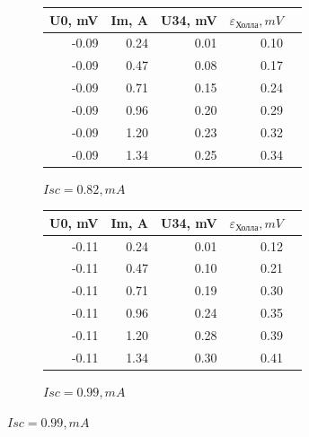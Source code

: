 \documentclass[a4paper, 12pt]{article}
\begin{document}
\begin{figure}[ht]
    \begin{subfigure}[b]{0.45\textwidth}
        \centering
        \begin{tabular}{|r|r|r|r|r|}
        \toprule
        U0, mV & Im, A & U34, mV & $\varepsilon_\text{Холла}, mV$ \\
        \midrule
        -0.09 & 0.24 & 0.01 & 0.10 \\
        -0.09 & 0.47 & 0.08 & 0.17 \\
        -0.09 & 0.71 & 0.15 & 0.24 \\
        -0.09 & 0.96 & 0.20 & 0.29 \\
        -0.09 & 1.20 & 0.23 & 0.32 \\
        -0.09 & 1.34 & 0.25 & 0.34 \\
        \bottomrule
        \end{tabular}
        \caption{$Isc = 0.82, mA$}
    \end{subfigure}
    \hfill
    \begin{subfigure}[b]{0.45\textwidth}
        \centering
        \begin{tabular}{|r|r|r|r|r|}
        \toprule
        U0, mV & Im, A & U34, mV & $\varepsilon_\text{Холла}, mV$ \\
        \midrule
        -0.11 & 0.24 & 0.01 & 0.12 \\
        -0.11 & 0.47 & 0.10 & 0.21 \\
        -0.11 & 0.71 & 0.19 & 0.30 \\
        -0.11 & 0.96 & 0.24 & 0.35 \\
        -0.11 & 1.20 & 0.28 & 0.39 \\
        -0.11 & 1.34 & 0.30 & 0.41 \\
        \bottomrule
        \end{tabular}
        \caption{$Isc = 0.99, mA$}
    \end{subfigure}

\end{figure}
\end{document}
